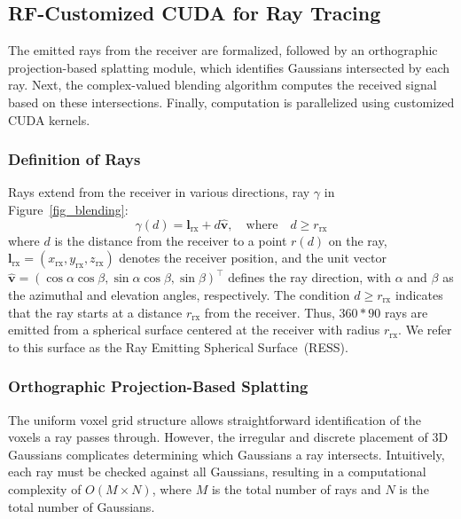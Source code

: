 \subsection{RF-Customized CUDA for Ray Tracing}

The emitted rays from the receiver are formalized, followed by an orthographic projection-based splatting module, which identifies Gaussians intersected by each ray.  
Next, the complex-valued blending algorithm computes the received signal based on these intersections.  
Finally, computation is parallelized using customized CUDA kernels.


\subsubsection{Definition of Rays}
Rays extend from the receiver in various directions, \eg ray \(\gamma\) in Figure~\ref{fig_blending}:
\begin{equation}
\label{eqn_ray_define}
\gamma(d) = \mathbf{l}_{\text{rx}} + d \hat{\mathbf{v}}, \quad \text{where} \quad d \geq r_{\text{rx}}
\end{equation}
where \(d\) is the distance from the receiver to a point \(r(d)\) on the ray, \(\mathbf{l}_{\text{rx}} = \left(x_{\text{rx}}, y_{\text{rx}}, z_{\text{rx}}\right)\) denotes the receiver position, and the unit vector \(\hat{\mathbf{v}} = \left(\cos\alpha \cos\beta, \sin\alpha \cos\beta, \sin\beta\right)^\top\) defines the ray direction, with \(\alpha\) and \(\beta\) as the azimuthal and elevation angles, respectively.  
The condition \(d \geq r_{\text{rx}}\) indicates that the ray starts at a distance \(r_{\text{rx}}\) from the receiver.
Thus, \(360 * 90\) rays are emitted from a spherical surface centered at the receiver with radius \(r_{\text{rx}}\).
We refer to this surface as the Ray Emitting Spherical Surface~(RESS).



\subsubsection{Orthographic Projection-Based Splatting}\label{sec_ortho}
The uniform voxel grid structure allows straightforward identification of the voxels a ray passes through.  
However, the irregular and discrete placement of 3D Gaussians complicates determining which Gaussians a ray intersects.  
Intuitively, each ray must be checked against all Gaussians, resulting in a computational complexity of \(O(M \times N)\), where \(M\) is the total number of rays and \(N\) is the total number of Gaussians.


